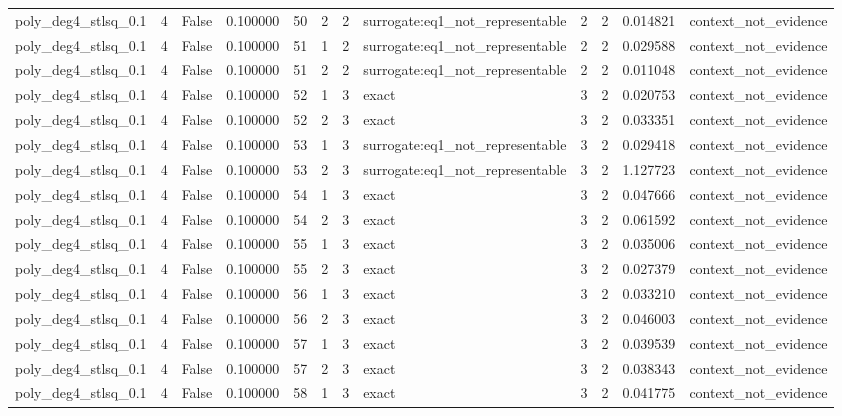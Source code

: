 \begin{tabular}{lrrrrrrlrrrl}
poly\_deg4\_stlsq\_0.1 & 4 & False & 0.100000 & 50 & 2 & 2 & surrogate:eq1\_not\_representable & 2 & 2 & 0.014821 & context\_not\_evidence \\
poly\_deg4\_stlsq\_0.1 & 4 & False & 0.100000 & 51 & 1 & 2 & surrogate:eq1\_not\_representable & 2 & 2 & 0.029588 & context\_not\_evidence \\
poly\_deg4\_stlsq\_0.1 & 4 & False & 0.100000 & 51 & 2 & 2 & surrogate:eq1\_not\_representable & 2 & 2 & 0.011048 & context\_not\_evidence \\
poly\_deg4\_stlsq\_0.1 & 4 & False & 0.100000 & 52 & 1 & 3 & exact & 3 & 2 & 0.020753 & context\_not\_evidence \\
poly\_deg4\_stlsq\_0.1 & 4 & False & 0.100000 & 52 & 2 & 3 & exact & 3 & 2 & 0.033351 & context\_not\_evidence \\
poly\_deg4\_stlsq\_0.1 & 4 & False & 0.100000 & 53 & 1 & 3 & surrogate:eq1\_not\_representable & 3 & 2 & 0.029418 & context\_not\_evidence \\
poly\_deg4\_stlsq\_0.1 & 4 & False & 0.100000 & 53 & 2 & 3 & surrogate:eq1\_not\_representable & 3 & 2 & 1.127723 & context\_not\_evidence \\
poly\_deg4\_stlsq\_0.1 & 4 & False & 0.100000 & 54 & 1 & 3 & exact & 3 & 2 & 0.047666 & context\_not\_evidence \\
poly\_deg4\_stlsq\_0.1 & 4 & False & 0.100000 & 54 & 2 & 3 & exact & 3 & 2 & 0.061592 & context\_not\_evidence \\
poly\_deg4\_stlsq\_0.1 & 4 & False & 0.100000 & 55 & 1 & 3 & exact & 3 & 2 & 0.035006 & context\_not\_evidence \\
poly\_deg4\_stlsq\_0.1 & 4 & False & 0.100000 & 55 & 2 & 3 & exact & 3 & 2 & 0.027379 & context\_not\_evidence \\
poly\_deg4\_stlsq\_0.1 & 4 & False & 0.100000 & 56 & 1 & 3 & exact & 3 & 2 & 0.033210 & context\_not\_evidence \\
poly\_deg4\_stlsq\_0.1 & 4 & False & 0.100000 & 56 & 2 & 3 & exact & 3 & 2 & 0.046003 & context\_not\_evidence \\
poly\_deg4\_stlsq\_0.1 & 4 & False & 0.100000 & 57 & 1 & 3 & exact & 3 & 2 & 0.039539 & context\_not\_evidence \\
poly\_deg4\_stlsq\_0.1 & 4 & False & 0.100000 & 57 & 2 & 3 & exact & 3 & 2 & 0.038343 & context\_not\_evidence \\
poly\_deg4\_stlsq\_0.1 & 4 & False & 0.100000 & 58 & 1 & 3 & exact & 3 & 2 & 0.041775 & context\_not\_evidence \\

\end{tabular}
